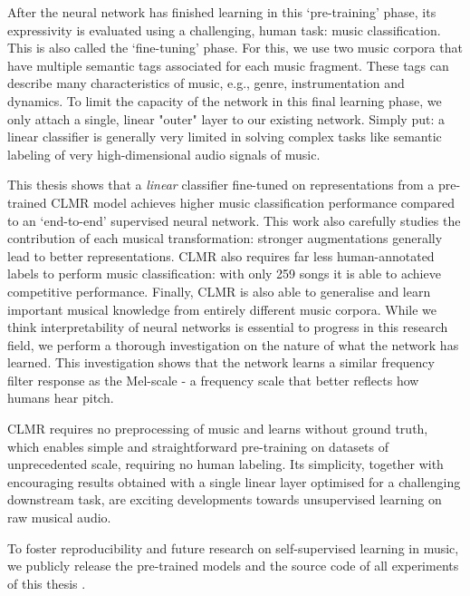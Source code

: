 After the neural network has finished learning in this `pre-training' phase, its expressivity is evaluated using a challenging, human task: music classification. This is also called the `fine-tuning' phase. For this, we use two music corpora that have multiple semantic tags associated for each music fragment. These tags can describe many characteristics of music, e.g., genre, instrumentation and dynamics. To limit the capacity of the network in this final learning phase, we only attach a single, linear "outer" layer to our existing network. Simply put: a linear classifier is generally very limited in solving complex tasks like semantic labeling of very high-dimensional audio signals of music. 

This thesis shows that a \textit{linear} classifier fine-tuned on representations from a pre-trained CLMR model achieves higher music classification performance compared to an `end-to-end' supervised neural network. This work also carefully studies the contribution of each musical transformation: stronger augmentations generally lead to better representations. CLMR also requires far less human-annotated labels to perform music classification: with only 259 songs it is able to achieve competitive performance. Finally, CLMR is also able to generalise and learn important musical knowledge from entirely different music corpora. While we think interpretability of neural networks is essential to progress in this research field, we perform a thorough investigation on the nature of what the network has learned. This investigation shows that the network learns a similar frequency filter response as the Mel-scale - a frequency scale that better reflects how humans hear pitch.

CLMR requires no preprocessing of music and learns without ground truth, which enables simple and straightforward pre-training on datasets of unprecedented scale, requiring no human labeling. Its simplicity, together with encouraging results obtained with a single linear layer optimised for a challenging downstream task, are exciting developments towards unsupervised learning on raw musical audio.


To foster reproducibility and future research on self-supervised learning in music, we publicly release the pre-trained models and the source code of all experiments of this thesis .




